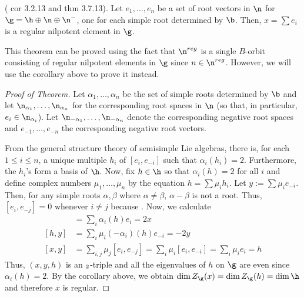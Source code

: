 \begin{thm}
  (\cite{cg} cor 3.2.13 and thm 3.7.13). Let \(e_1, \ldots, e_n\) be a
  set of root vectors in \(\n\) for \(\g = \h \oplus \n \oplus
  \n^-\), one for each simple root determined by \(\b\). Then, \(x =
  \sum e_i\) is a regular nilpotent element in \(\g\).
\end{thm}
\begin{rmk}
  This theorem can be proved using the fact that \(\n^{reg}\) is a
  single \(B\)-orbit consisting of regular nilpotent elements in
  \(\g\) since \(n \in \n^{reg}\). However, we will use the corollary
  above to prove it instead.
\end{rmk}
\begin{proof}[Proof of Theorem]
  Let \(\alpha_1, \ldots, \alpha_n\) be the set of simple roots
  determined by \(\b\) and let \(\n_{\alpha_1}, \ldots,
  \n_{\alpha_n}\) for the corresponding root spaces in \(\n\) (so
  that, in  particular, \(e_i \in \n_{\alpha_i}\)). Let
  \(\n_{-\alpha_1}, \ldots, \n_{-\alpha_n}\) denote the corresponding negative root
  spaces and \(e_{-1}, \ldots, e_{-n}\) the corresponding negative
  root vectors.

  From the general structure theory of semisimple Lie algebras, there
  is, for each \(1 \leq i \leq n\), a unique multiple \(h_i\) of
  \([e_i, e_{-i}]\) such that \(\alpha_i(h_i) = 2\). Furthermore, the
  \(h_i\)'s form a basis of \(\h\). Now, fix \(h \in \h\) so that
  \(\alpha_i(h) = 2\) for all \(i\) and define complex numbers
  \(\mu_1, \ldots, \mu_n\) by the equation \(h = \sum \mu_i h_i\). Let
  \(y := \sum \mu_i e_{-i}\). Then, for any simple roots \(\alpha,
  \beta\) where \(\alpha \neq \beta\), \(\alpha - \beta\) is not a
  root. Thus, \([e_i, e_{-j}] = 0\) whenever \(i \neq j\) because
  . Now, we calculate 
  \begin{align*}
    [h,x] & = \sum_i \alpha_i(h) e_i = 2x \\
    [h,y] & = \sum_i \mu_i(-\alpha_i)(h)e_{-i} = -2y \\
    [x,y] & = \sum_{i,j} \mu_j [e_i, e_{-j}] = \sum_i \mu_i [e_i,
            e_{-i}] = \sum_i \mu_i e_i = h
  \end{align*}
  Thus, \((x,y,h)\) is an \(\sl_2\)-triple and all the eigenvalues of
  \(h\) on \(\g\) are even since \(\alpha_i(h) = 2\). By the corollary
  above, we obtain \(\dim Z_\g(x) = \dim Z_\g(h) = \dim \h\) and
  therefore \(x\) is regular.
\end{proof}
